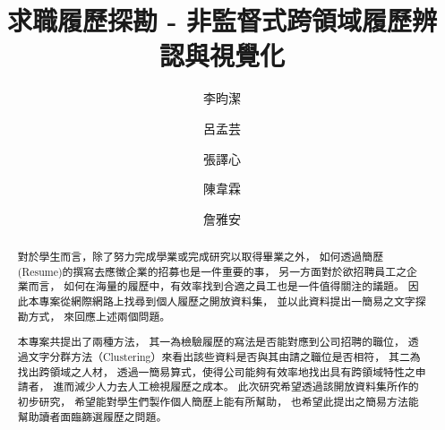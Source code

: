 \documentclass[acmsmall]{acmart}
\begin{document}
\title{求職履歷探勘 - 非監督式跨領域履歷辨認與視覺化}


\author{李昀潔}
\author{呂孟芸}
\author{張譯心}
\author{陳韋霖}
\author{詹雅安}


\begin{abstract}
    對於學生而言，除了努力完成學業或完成研究以取得畢業之外，
    如何透過簡歷(Resume)的撰寫去應徵企業的招募也是一件重要的事，
    另一方面對於欲招聘員工之企業而言，
    如何在海量的履歷中，有效率找到合適之員工也是一件值得關注的議題。
    因此本專案從網際網路上找尋到個人履歷之開放資料集，
    並以此資料提出一簡易之文字探勘方式，
    來回應上述兩個問題。

    本專案共提出了兩種方法，
    其一為檢驗履歷的寫法是否能對應到公司招聘的職位，
    透過文字分群方法（Clustering）來看出該些資料是否與其由請之職位是否相符，
    其二為找出跨領域之人材，
    透過一簡易算式，使得公司能夠有效率地找出具有跨領域特性之申請者，
    進而減少人力去人工檢視履歷之成本。
    此次研究希望透過該開放資料集所作的初步研究，
    希望能對學生們製作個人簡歷上能有所幫助，
    也希望此提出之簡易方法能幫助讀者面臨篩選履歷之問題。
\end{abstract}

\end{document}
